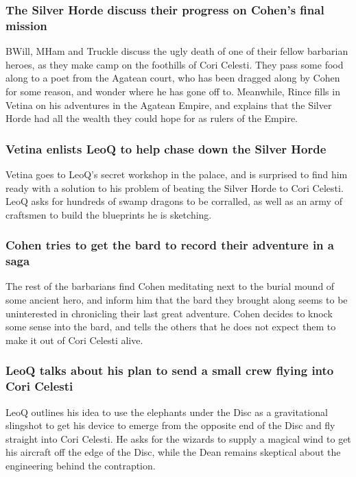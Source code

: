 \subsubsection{The Silver Horde discuss their progress on \Gls{Cohen}'s final mission}
\Gls{BWill}, \Gls{MHam} and \Gls{Truckle} discuss the ugly death of one of their fellow barbarian
heroes, as they make camp on the foothills of Cori Celesti. They pass some food along to a poet
from the Agatean court, who has been dragged along by \Gls{Cohen} for some reason, and wonder where
he has gone off to. Meanwhile, \Gls{Rince} fills in \Gls{Vetina} on his adventures in the Agatean
Empire, and explains that the Silver Horde had all the wealth they could hope for as rulers of the
Empire.

\subsubsection{\Gls{Vetina} enlists \Gls{LeoQ} to help chase down the Silver Horde}
\Gls{Vetina} goes to \Gls{LeoQ}'s secret workshop in the palace, and is surprised to find him ready
with a solution to his problem of beating the Silver Horde to Cori Celesti. \Gls{LeoQ} asks for
hundreds of swamp dragons to be corralled, as well as an army of craftsmen to build the blueprints
he is sketching.

\subsubsection{\Gls{Cohen} tries to get the bard to record their adventure in a saga}
The rest of the barbarians find \Gls{Cohen} meditating next to the burial mound of some ancient
hero, and inform him that the bard they brought along seems to be uninterested in chronicling
their last great adventure. \Gls{Cohen} decides to knock some sense into the bard, and tells the
others that he does not expect them to make it out of Cori Celesti alive.

\subsubsection{\Gls{LeoQ} talks about his plan to send a small crew flying into Cori Celesti}
\Gls{LeoQ} outlines his idea to use the elephants under the Disc as a gravitational slingshot to
get his device to emerge from the opposite end of the Disc and fly straight into Cori Celesti. He
asks for the wizards to supply a magical wind to get his aircraft off the edge of the Disc, while
the \Gls{Dean} remains skeptical about the engineering behind the contraption.

